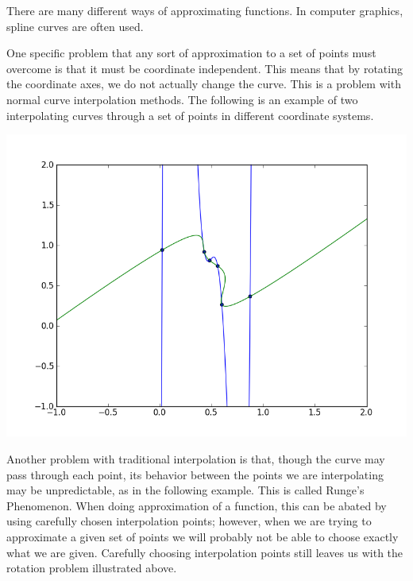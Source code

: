 

There are many different ways of approximating functions. In computer graphics, spline curves are often used. 

One specific problem that any sort of approximation to a set of points must overcome is that it must be coordinate independent. This means that by rotating the coordinate axes, we do not actually change the curve. This is a problem with normal curve interpolation methods. The following is an example of two interpolating curves through a set of points in different coordinate systems.

\includegraphics[width=\textwidth]{bad_interpolation}

Another problem with traditional interpolation is that, though the curve may pass through each point, its behavior between the points we are interpolating may be unpredictable, as in the following example. This is called Runge's Phenomenon. When doing approximation of a function, this can be abated by using carefully chosen interpolation points; however, when we are trying to approximate a given set of points we will probably not be able to choose exactly what we are given. Carefully choosing interpolation points still leaves us with the rotation problem illustrated above.

